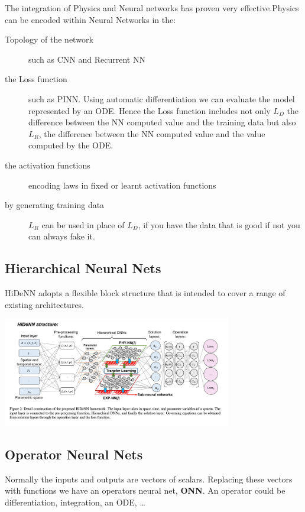 The integration of Physics and Neural networks has proven very effective.Physics can be encoded within Neural Networks in the:
\begin{description}
\item [Topology of the network]  such as CNN and Recurrent NN
\item [the Loss function]  such as PINN. Using automatic differentiation we  can evaluate the model represented by an ODE. Hence the Loss function includes not only $L_D$ the difference between the NN computed value and the training data but also $L_R$, the difference between the NN computed value and the value computed by the ODE.
\item [the activation functions] encoding laws in fixed or learnt activation functions
\item [by generating training data] $L_R$ can be used in place of $L_D$, if you have the data that is good if not you can always fake it.
\end{description}





\subsection{Hierarchical Neural Nets} HiDeNN adopts a flexible block structure that is intended to cover a range of existing architectures.

\begin{center}
\includegraphics[width=100mm]{HiDeNN.jpg}
\end{center}

\subsection{Operator Neural Nets}
Normally the inputs and outputs  are vectors of scalars. Replacing these vectors with functions  we have an operators neural net, {\bf ONN}. An operator could be differentiation, integration, an ODE, \ldots


